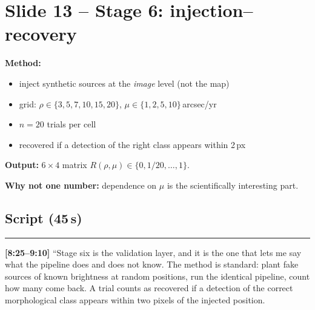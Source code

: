 \documentclass[11pt,a4paper]{article}
\begin{document}
\section{Slide 13 -- Stage 6: injection--recovery}

\textbf{Method:}
\begin{itemize}[leftmargin=1em,itemsep=1pt]
\item inject synthetic sources at the \emph{image} level (not the map)
\item grid: $\rho \in \{3,5,7,10,15,20\}$, $\mu \in \{1,2,5,10\}$\,arcsec/yr
\item $n = 20$ trials per cell
\item recovered if a detection of the right class appears within 2\,px
\end{itemize}

\textbf{Output:} $6\times4$ matrix $R(\rho,\mu) \in \{0, 1/20, \dots, 1\}$.

\textbf{Why not one number:} dependence on $\mu$ is the scientifically interesting part.

\begin{center}
\end{center}

\subsection*{Script (45\,s)}
\noindent\rule{\linewidth}{0.3pt}\par\smallskip\noindent
\textbf{[8:25--9:10]} ``Stage six is the validation layer, and it is the one that lets me say what the
pipeline does and does not know. The method is standard: plant fake sources of known brightness at
random positions, run the identical pipeline, count how many come back. A trial counts as recovered if
a detection of the correct morphological class appears within two pixels of the injected position.
\end{document}
